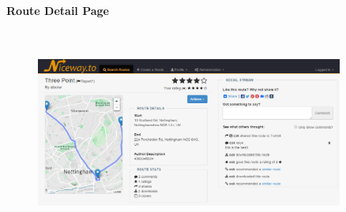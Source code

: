 \paragraph{Route Detail Page}\ \\
\begin{figure}[!ht]
	\vspace{-6mm}
	\begin{center}
		\includegraphics[width=0.9\textwidth]{images/design/detail.png}
	\end{center}
	\vspace{-8mm}
\end{figure}

